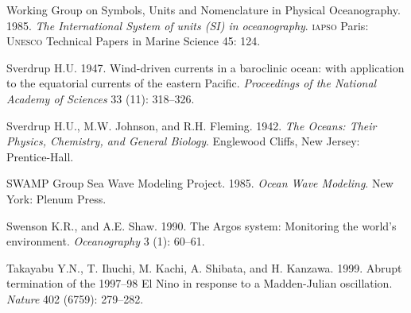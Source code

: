 \begin{thebibliography}{999}
Working Group on Symbols, Units and Nomenclature in Physical
Oceanography. 1985. \textit{The International System of units (SI) in
  oceanography}. \textsc{iapso} Paris: \textsc{Unesco} Technical
Papers in Marine Science 45: 124.
%

Sverdrup H.U.  1947. Wind-driven currents in a baroclinic ocean: with
application to the equatorial currents of the eastern Pacific.
\textit{Proceedings of the National Academy of Sciences} 33 (11):
318--326.
%

Sverdrup H.U., M.W. Johnson, and R.H. Fleming. 1942. \textit{The
  Oceans: Their Physics, Chemistry, and General Biology}.  Englewood
Cliffs, New Jersey: Prentice-Hall.
%

SWAMP Group Sea Wave Modeling Project. 1985. \textit{Ocean Wave
  Modeling}. New York: Plenum Press.
%

Swenson K.R., and A.E. Shaw.  1990. The Argos system: Monitoring the
world's environment. \textit{Oceanography} 3 (1): 60--61.
%

Takayabu Y.N., T. Ihuchi, M. Kachi, A. Shibata, and
H. Kanzawa. 1999. Abrupt termination of the 1997--98 El Nino in
response to a Madden-Julian oscillation. \textit{Nature} 402 (6759):
279--282.
%


\end{thebibliography}

